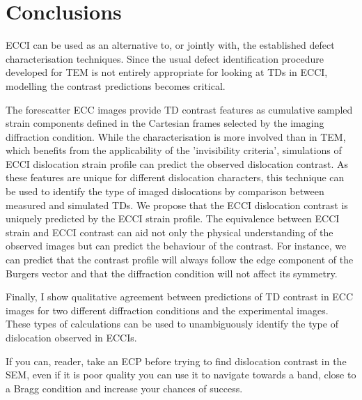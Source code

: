 \section{Conclusions}
ECCI can be used as an alternative to, or jointly with, the established defect characterisation techniques. Since the usual defect identification procedure developed for TEM is not entirely appropriate for looking at TDs in ECCI, modelling the contrast predictions becomes critical. 

The forescatter ECC images provide TD contrast features as cumulative sampled strain components defined in the Cartesian frames selected by the imaging diffraction condition. While the characterisation is more involved than in TEM, which benefits from the applicability of the 'invisibility criteria', simulations of ECCI dislocation strain profile can predict the observed dislocation contrast. As these features are unique for different dislocation characters, this technique can be used to identify the type of imaged dislocations by comparison between measured and simulated TDs. We propose that the ECCI dislocation contrast is uniquely predicted by the ECCI strain profile. The equivalence between ECCI strain and ECCI contrast can aid not only the physical understanding of the observed images but can predict the behaviour of the contrast. For instance, we can predict that the contrast profile will always follow the edge component of the Burgers vector and that the diffraction condition will not affect its symmetry.


Finally, I show qualitative agreement between predictions of TD contrast in ECC images for two different diffraction conditions and the experimental images. These types of calculations can be used to  unambiguously identify  the type of dislocation observed in ECCIs. 


If you can, reader, take an ECP before trying to find dislocation contrast in the SEM, even if it is poor quality you can use it to navigate towards a band, close to a Bragg condition and increase your chances of success. 



      
